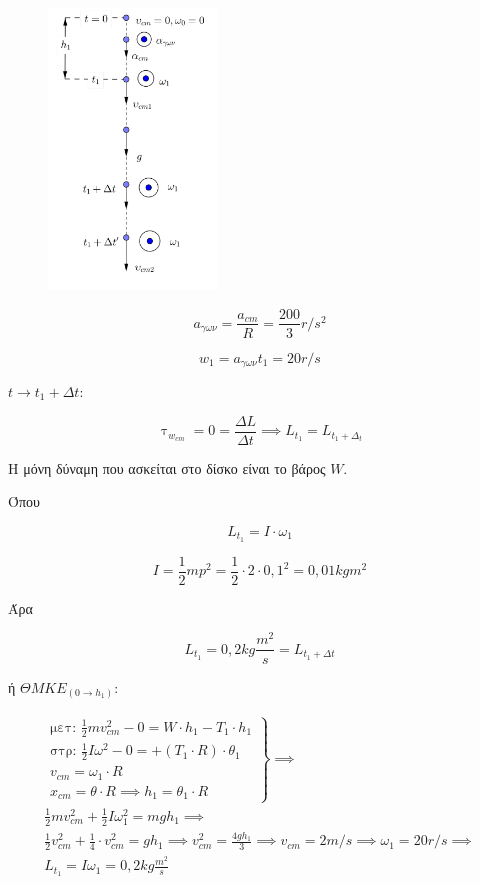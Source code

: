 \documentclass[12pt]{article}
\begin{document}
\begin{enumerate}
    \begin{figure}[h]
      \includegraphics[width=0.4\textwidth]{ΦυσικήΔ3.png}
      \centering
    \end{figure}

    $$a_{γων}=\frac{a_{cm}}{R}=\frac{200}{3}r/s^2$$

    $$w_1=a_{γων}t_1=20r/s$$

    $t \to t_1+Δt$:

    $$\uptau_{w_{cm}}=0=\frac{ΔL}{Δt}\implies L_{t_1}=L_{t_1+Δ_t}$$

    Η μόνη δύναμη που ασκείται στο δίσκο είναι το βάρος $W$.

    Όπου

    $$L_{t_1}=I\cdot ω_1$$

    $$I=\frac{1}{2}mp^2=\frac{1}{2}\cdot 2 \cdot 0,1^2=0,01kg m^2$$

    Άρα

    $$L_{t_1}=0,2kg\frac{m^2}{s}=L_{t_1+Δt}$$

    ή $ΘΜΚΕ_{(0\to h_1)}:$

    \begin{gather*}
      \left. \begin{matrix}\text{μετ: }\frac{1}{2}mv_{cm}^2-0=W\cdot h_1-T_1\cdot h_1 \\ \text{στρ: } \frac{1}{2}Iω^2-0=+(T_1\cdot R)\cdot θ_1 \\ v_{cm}=ω_1\cdot R \\ x_{cm}=θ\cdot R\implies h_1=θ_1\cdot R \end{matrix} \right\}\implies \\      \frac{1}{2}mv_{cm}^2+\frac{1}{2}Iω_1^2=mgh_1\implies  \\
      \frac{1}{2}v_{cm}^2+\frac{1}{4}\cdot v_{cm}^2=gh_1 \implies v_{cm}^2=\frac{4gh_1}{3}\implies v_{cm}=2m/s \implies ω_1=20r/s \implies \\
       L_{t_1}=Iω_1=0,2kg \frac{m^2}{s}
    \end{gather*}


\end{enumerate}
\end{document}
